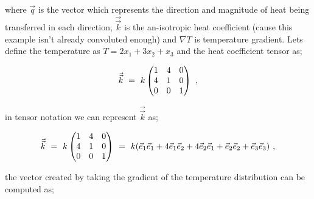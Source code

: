 \documentclass{article}
\begin{document}
where \begin{math} \vec{q} \end{math} is the vector which represents the direction and magnitude of heat being transferred in each direction, \begin{math} \vec{\vec{k}} \end{math} is the an-isotropic heat coefficient (cause this example isn't already convoluted enough) and \begin{math} \nabla{T} \end{math} is temperature gradient. Lets define the temperature as \begin{math} T = 2 x_1 + 3 x_2 + x_3 \end{math} and the heat coefficient tensor as;

\begin{equation} \label{eb-eq-266-1}
\vec{\vec{k}} \hspace{0.125cm} = \hspace{0.125cm} k \begin{pmatrix} 
1 & 4 & 0 \\
4 & 1 & 0 \\
0 & 0 & 1 \\
\end{pmatrix} \hspace{0.125cm} ,
\end{equation} 

in tensor notation we can represent \begin{math} \vec{\vec{k}} \end{math} as;

\begin{equation} \label{eb-eq-1-5}
\vec{\vec{k}} \hspace{0.125cm} = \hspace{0.125cm} k \begin{pmatrix} 
1 & 4 & 0 \\
4 & 1 & 0 \\
0 & 0 & 1 \\
\end{pmatrix} \hspace{0.125cm} = \hspace{0.125cm} k ( \vec{e}_1\vec{e}_1 + 4 \vec{e}_1\vec{e}_2 + 4 \vec{e}_2\vec{e}_1 + \vec{e}_2\vec{e}_2 + \vec{e}_3\vec{e}_3 ) \hspace{0.125cm} ,
\end{equation}

the vector created by taking the gradient of the temperature distribution can be computed as;
\end{document}
